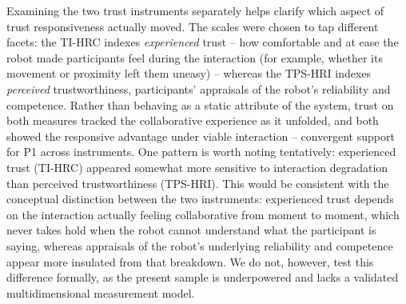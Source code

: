 \documentclass[
  authoryear,
  doubleblind,
  3p]{elsarticle}
\begin{document}
Examining the two trust instruments separately helps clarify which
aspect of trust responsiveness actually moved. The scales were chosen to
tap different facets: the TI-HRC indexes \emph{experienced} trust -- how
comfortable and at ease the robot made participants feel during the
interaction (for example, whether its movement or proximity left them
uneasy) -- whereas the TPS-HRI indexes \emph{perceived} trustworthiness,
participants' appraisals of the robot's reliability and competence.
Rather than behaving as a static attribute of the system, trust on both
measures tracked the collaborative experience as it unfolded, and both
showed the responsive advantage under viable interaction -- convergent
support for P1 across instruments. One pattern is worth noting
tentatively: experienced trust (TI-HRC) appeared somewhat more sensitive
to interaction degradation than perceived trustworthiness (TPS-HRI).
This would be consistent with the conceptual distinction between the two
instruments: experienced trust depends on the interaction actually
feeling collaborative from moment to moment, which never takes hold when
the robot cannot understand what the participant is saying, whereas
appraisals of the robot's underlying reliability and competence appear
more insulated from that breakdown. We do not, however, test this
difference formally, as the present sample is underpowered and lacks a
validated multidimensional measurement model.
\end{document}
